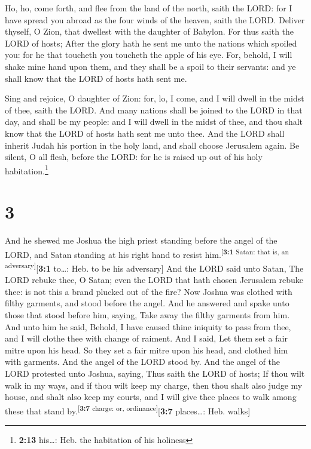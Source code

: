  Ho, ho, come forth, and flee from the land of the north,
saith the LORD: for I have spread you abroad as the four winds of the
heaven, saith the LORD.  Deliver thyself, O Zion, that
dwellest with the daughter of Babylon.  For thus saith the
LORD of hosts; After the glory hath he sent me unto the nations which
spoiled you: for he that toucheth you toucheth the apple of his eye.
 For, behold, I will shake mine hand upon them, and they
shall be a spoil to their servants: and ye shall know that the LORD of
hosts hath sent me.

 Sing and rejoice, O daughter of Zion: for, lo, I come,
and I will dwell in the midst of thee, saith the LORD. 
And many nations shall be joined to the LORD in that day, and shall be
my people: and I will dwell in the midst of thee, and thou shalt know
that the LORD of hosts hath sent me unto thee.  And the
LORD shall inherit Judah his portion in the holy land, and shall choose
Jerusalem again.  Be silent, O all flesh, before the
LORD: for he is raised up out of his holy habitation.\footnote{\textbf{2:13}
  his\ldots: Heb. the habitation of his holiness}

\hypertarget{section-2}{%
\section{3}\label{section-2}}

 And he shewed me Joshua the high priest standing before
the angel of the LORD, and Satan standing at his right hand to resist
him.\textsuperscript{{[}\textbf{3:1} Satan: that is, an
adversary{]}}{[}\textbf{3:1} to\ldots: Heb. to be his adversary{]}
 And the LORD said unto Satan, The LORD rebuke thee, O
Satan; even the LORD that hath chosen Jerusalem rebuke thee: is not this
a brand plucked out of the fire?  Now Joshua was clothed
with filthy garments, and stood before the angel.  And he
answered and spake unto those that stood before him, saying, Take away
the filthy garments from him. And unto him he said, Behold, I have
caused thine iniquity to pass from thee, and I will clothe thee with
change of raiment.  And I said, Let them set a fair mitre
upon his head. So they set a fair mitre upon his head, and clothed him
with garments. And the angel of the LORD stood by.  And
the angel of the LORD protested unto Joshua, saying,  Thus
saith the LORD of hosts; If thou wilt walk in my ways, and if thou wilt
keep my charge, then thou shalt also judge my house, and shalt also keep
my courts, and I will give thee places to walk among these that stand
by.\textsuperscript{{[}\textbf{3:7} charge: or,
ordinance{]}}{[}\textbf{3:7} places\ldots: Heb. walks{]}

